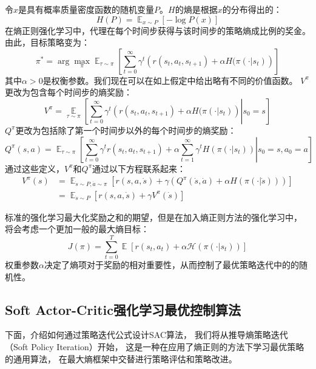 \documentclass[AutoFakeBold]{LZUThesis}
\begin{document}
令$x$是具有概率质量密度函数的随机变量$P$。$H$的熵是根据$x$的分布得出的：
\begin{equation*}
  H(P) = \mathop{\mathbb{E}}_{x \sim P} \left[ - \log P(x) \right]
\end{equation*}
在熵正则强化学习中，代理在每个时间步获得与该时间步的策略熵成比例的奖金。
由此，目标策略\cite{haarnoja_reinforcement_2017}变为：
\begin{equation}
  \pi^* = \arg \max_{\pi} \mathop{\mathbb{E}}_{\tau\sim\pi} 
  \left[ \sum_{t = 0}^{\infty} \gamma^t \left( r(s_t, a_t, s_{t + 1}) 
  + \alpha H(\pi(\cdot | s_t) \right) \right]
\end{equation}
其中$\alpha > 0$是权衡参数。我们现在可以在如上假定中给出略有不同的价值函数。
$V^{\pi}$更改为包含每个时间步的熵奖励：
\begin{equation}
  V^\pi = \mathop{\mathbb{E}}\limits_{\tau\sim\pi} 
  \left[ \sum_{t = 0}^{\infty} \gamma^t \left( r(s_t, a_t, s_{t + 1}) 
  + \alpha H(\pi(\cdot | s_t) \right) \left| \right. s_0 = s \right]
\end{equation}
$Q^\pi$更改为包括除了第一个时间步以外的每个时间步的熵奖励：
\begin{equation}
  Q^\pi(s, a) = \mathop{\mathbb{E}}_{\tau \sim \pi} \left[ \sum_{t = 0}^{\infty} \gamma^t
  r(s_t, a_t, s_{t + 1}) + \alpha \sum_{t = 1}^{\infty} \gamma^t H(\pi(\cdot | s_t))
  \left|\right. s_0 = s, a_0 = a \right]
\end{equation}
通过这些定义，$V^\pi$和$Q^\pi$通过以下方程联系起来：
\begin{equation}
  \begin{aligned}
    V^\pi(s) &= \mathop{\mathbb{E}}_{\dot s \sim P, \dot a \sim \pi}
    \left[ r(s, a, \dot s) + \gamma(Q^\pi(\dot s, \dot a) + 
    \alpha H(\pi(\cdot | \dot s))) \right] \\
    &= \mathop{\mathbb{E}}_{\dot s \sim P}
    \left[ r(s, a, \dot s) + \gamma V^\pi(\dot s) \right]
  \end{aligned}
\end{equation}

标准的强化学习最大化奖励之和的期望，但是在加入熵正则方法的强化学习中，
将会考虑一个更加一般的最大熵目标：
\begin{equation}
  J(\pi) = \sum_{t = 0}^T \mathop{\mathbb{E}} \left[ r(s_t, a_t) 
  + \alpha \mathcal{H}(\pi(\cdot | s_t)) \right]
  \label{MEB}
\end{equation}
权重参数$\alpha$决定了熵项对于奖励的相对重要性，从而控制了最优策略迭代中的的随机性。

\subsection{Soft Actor-Critic强化学习最优控制算法}
下面，介绍如何通过策略迭代公式设计SAC算法\cite{haarnoja_soft_2018}，
我们将从推导熵策略迭代（Soft Policy Iteration）开始，
这是一种在应用了熵正则的方法下学习最优策略的通用算法，
在最大熵框架中交替进行策略评估和策略改进。
\end{document}
